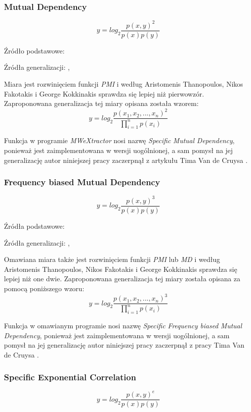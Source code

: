 \subsubsection{Mutual Dependency}
$$ y = log_{2}\frac{p(x, y)^{2}}{p(x)p(y)} $$

Źródło podstawowe: \cite[str. 2]{fbmd}
\par
Źródła generalizacji: \cite{generalization_patterns}, \cite[str. 2]{mmi_w11}
\par
Miara jest rozwinięciem funkcji \emph{PMI} i według Aristomenis Thanopoulos, Nikos Fakotakis i George Kokkinakis \cite{fbmd} sprawdza się lepiej niż pierwowzór.
Zaproponowana generalizacja tej miary opisana została wzorem:
$$ y = log_{2}\frac{p(x_{1}, x_{2}, ..., x_{n})^{2}}{\prod_{i = 1}^{n}p(x_{i})} $$

Funkcja w programie \emph{MWeXtractor} nosi nazwę \emph{Specific Mutual Dependency}, ponieważ jest zaimplementowana w wersji uogólnionej, a sam pomysł na jej generalizację autor niniejszej pracy zaczerpnął z artykułu Tima Van de Cruysa \cite{mmi_w11}.

\subsubsection{Frequency biased Mutual Dependency}
$$ y = log_{2}\frac{p(x, y)^{3}}{p(x)p(y)} $$

Źródła podstawowe: \cite[str. 2]{fbmd}
\par
Źródła generalizacji: \cite{generalization_patterns}, \cite[str. 2]{mmi_w11}
\par
Omawiana miara także jest rozwinięciem funkcji \emph{PMI} lub \emph{MD} i według Aristomenis Thanopoulos, Nikos Fakotakis i George Kokkinakis \cite{fbmd} sprawdza się lepiej niż one dwie.
Zaproponowana generalizacja tej miary została opisana za pomocą poniższego wzoru:
$$ y = log_{2}\frac{p(x_{1}, x_{2}, ..., x_{n})^{3}}{\prod_{i = 1}^{n} p(x_{i})} $$

Funkcja w omawianym programie nosi nazwę \emph{Specific Frequency biased Mutual Dependency}, ponieważ jest zaimplementowana w wersji uogólnionej, a sam pomysł na jej generalizację autor niniejszej pracy zaczerpnął z pracy Tima Van de Cruysa \cite{mmi_w11}.

\subsubsection{Specific Exponential Correlation}
$$ y = log_{2}\frac{p(x, y)^{e}}{p(x)p(y)} $$

